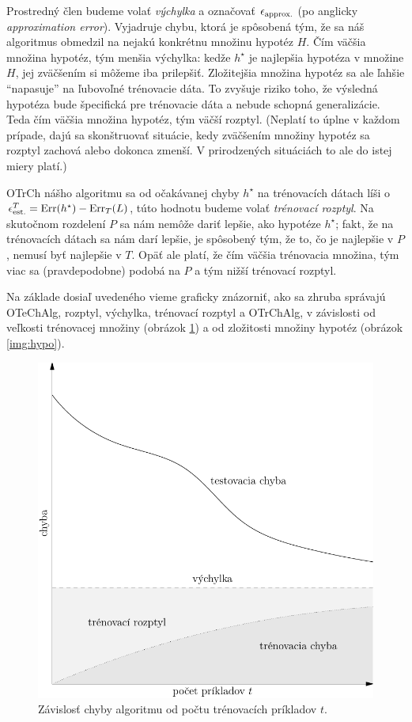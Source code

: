 Prostredný člen budeme volať \emph{výchylka} a označovať ${\epsilon_\text{approx.}}$
(po anglicky \emph{approximation error}). Vyjadruje chybu, ktorá je spôsobená tým,
že sa náš algoritmus obmedzil na nejakú konkrétnu množinu hypotéz $H$.
Čím väčšia množina hypotéz, tým menšia výchylka: kedže $h^\star$ je
najlepšia hypotéza v množine $H$, jej zväčšením si môžeme iba prilepšiť.
Zložitejšia množina hypotéz sa ale ľahšie ``napasuje'' na ľubovoľné
trénovacie dáta. To zvyšuje riziko toho, že výsledná hypotéza bude
špecifická pre trénovacie dáta a nebude schopná generalizácie. Teda
čím väčšia množina hypotéz, tým väčší rozptyl. (Neplatí to úplne
v každom prípade, dajú sa skonštruovať situácie, kedy zväčšením
množiny hypotéz sa rozptyl zachová alebo dokonca zmenší. V prirodzených
situáciách to ale do istej miery platí.)

OTrCh nášho algoritmu sa od očakávanej chyby $h^\star$ na trénovacích
dátach líši o ${\epsilon^T_\text{est.}} = \mathrm{Err}(h^\star) - \mathrm{Err}_T(L)$, túto hodnotu
budeme volať \emph{trénovací rozptyl}. Na skutočnom rozdelení $P$ sa
nám nemôže dariť lepšie, ako hypotéze $h^\star$; fakt, že na trénovacích
dátach sa nám darí lepšie, je spôsobený tým, že to, čo je najlepšie
v $P$, nemusí byť najlepšie v $T$. Opäť ale platí, že čím väčšia
trénovacia množina, tým viac sa (pravdepodobne) podobá na $P$ a
tým nižší trénovací rozptyl.

Na základe dosiaľ uvedeného vieme graficky znázorniť, ako sa zhruba správajú
OTeChAlg, rozptyl, výchylka, trénovací rozptyl a OTrChAlg, v závislosti od
veľkosti trénovacej množiny (obrázok \ref{img:train}) a od zložitosti
množiny hypotéz (obrázok \ref{img:hypo}).

\begin{figure}
  \centering
  \includegraphics[scale=0.8]{obrazky/krivky1.pdf}
  \caption{Závislosť chyby algoritmu od počtu trénovacích príkladov $t$.}
  \label{img:train}
\end{figure}

